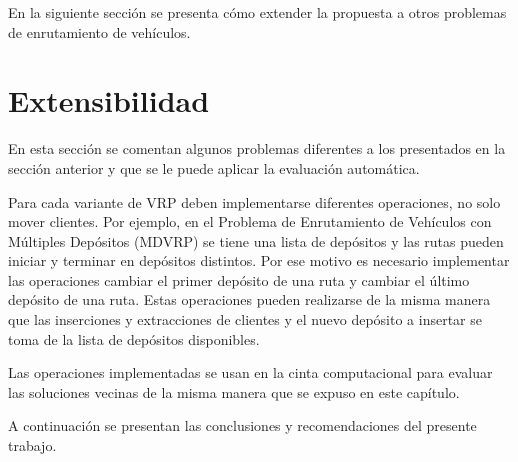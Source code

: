 En la siguiente sección se presenta cómo extender la propuesta a otros problemas de enrutamiento de vehículos.

\section{Extensibilidad}\label{4:Ext}

En esta sección se comentan algunos problemas diferentes a los presentados en la sección anterior y que se le puede aplicar la evaluación automática.

Para cada variante de VRP deben implementarse diferentes operaciones, no solo mover clientes. Por ejemplo, en el Problema de Enrutamiento de Vehículos con Múltiples Depósitos (MDVRP) se tiene una lista de depósitos y las rutas pueden iniciar y terminar en depósitos distintos. Por ese motivo es necesario implementar las operaciones cambiar el primer depósito de una ruta y cambiar el último depósito de una ruta. Estas operaciones pueden realizarse de la misma manera que las inserciones y extracciones de clientes y el nuevo depósito a insertar se toma de la lista de depósitos disponibles.

Las operaciones implementadas se usan en la cinta computacional para evaluar las soluciones vecinas de la misma manera que se expuso en este capítulo.

A continuación se presentan las conclusiones y recomendaciones del presente trabajo.





























